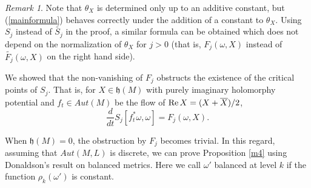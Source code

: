 \documentclass[12pt,reqno,a4paper]{amsart}
\numberwithin{equation}{section}
\def\re{{\rm Re\,}}
\theoremstyle{remark}
\newtheorem{remark}{Remark}
\theoremstyle{dotless}
\begin{document}
\begin{remark}
Note that $\theta_X$ is determined only up to an additive constant, but (\ref{mainformula}) behaves correctly under the addition of a constant to $\theta_X$. Using $S_j$ instead of $\widetilde{S_j}$ in the proof, a similar formula can be obtained which does not depend on the normalization of $\theta_X$ for $j>0$ (that is, $F_j(\omega,X)$ instead of $\widetilde{F_j}(\omega,X)$ on the right hand side). 
\end{remark}

We showed that the non-vanishing of $F_j$ obstructs the existence of the critical points of $S_j$. That is, for $X\in\mathfrak{h}(M)$ with purely imaginary holomorphy potential and $f_t \in Aut(M)$ be the flow of $\re X=(X+\overline{X})/2$,
\begin{equation*}
\frac{d}{dt}S_j[f^*_t\omega,\omega]=F_j(\omega,X).
\end{equation*}

When $\mathfrak{h}(M)=0$, the obstruction by $F_j$ becomes trivial. In this regard, assuming that $Aut(M,L)$ is discrete, we can prove Proposition \ref{m4} using Donaldson's result on balanced metrics. Here we call $\omega'$ balanced at level $k$ if the function $\rho_k(\omega')$ is constant.  
\end{document}
